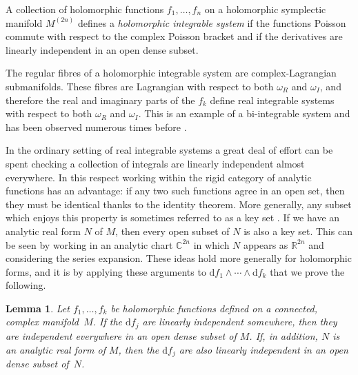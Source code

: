 \documentclass[pdftex]{sigma}
\numberwithin{equation}{section}
\newtheorem{Lemma}[Theorem]{Lemma}
\newcommand{\R}{\mathbb{R}}
\newcommand{\C}{\mathbb{C}}
\begin{document}
\begin{Definition}A collection of holomorphic functions $f_1,\dots,f_n$ on a holomorphic symplectic manifold $M^{(2n)}$ defines a \emph{holomorphic integrable system} if the functions Poisson commute with respect to the complex Poisson bracket and if the derivatives are linearly independent in an open dense subset.
\end{Definition}

The regular fibres of a holomorphic integrable system are complex-Lagrangian submanifolds. These fibres are Lagrangian with respect to both $\omega_R$ and $\omega_I$, and therefore the real and imaginary parts of the $f_k$ define real integrable systems with respect to both $\omega_R$ and $\omega_I$. This is an example of a bi-integrable system and has been observed numerous times before \cite{biham, biham2}.

In the ordinary setting of real integrable systems a great deal of effort can be spent checking a collection of integrals are linearly independent almost everywhere. In this respect working within the rigid category of analytic functions has an advantage: if any two such functions agree in an open set, then they must be identical thanks to the identity theorem. More generally, any subset which enjoys this property is sometimes referred to as a key set \cite{arnoldkeyset,kozlovkeyset}. If we have an analytic real form $N$ of $M$, then every open subset of $N$ is also a key set. This can be seen by working in an analytic chart $\C^{2n}$ in which $N$ appears as $\R^{2n}$ and considering the series expansion. These ideas hold more generally for holomorphic forms, and it is by applying these arguments to $\mathrm{d}f_1\wedge\cdots\wedge \mathrm{d}f_k$ that we prove the following.

\begin{Lemma}\label{keyset_lemma}
	Let $f_1,\dots,f_k$ be holomorphic functions defined on a connected, complex manifold~$M$. If the $\mathrm{d}f_j$ are linearly independent somewhere, then they are independent everywhere in an open dense subset of $M$. If, in addition, $N$ is an analytic real form of $M$, then the $\mathrm{d}f_j$ are also linearly independent in an open dense subset of~$N$.
\end{Lemma}
\end{document}
